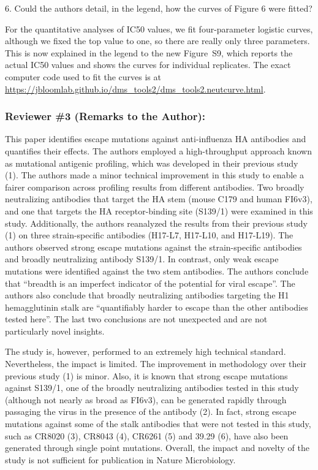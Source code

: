 \documentclass[11pt, oneside]{article}   	%
\begin{document}
6. Could the authors detail, in the legend, how the curves of Figure 6 were fitted?

{\color{black}
For the quantitative analyses of IC50 values, we fit four-parameter logistic curves, although we fixed the top value to one, so there are really only three parameters.
This is now explained in the legend to the new Figure~S9, which reports the actual IC50 values and shows the curves for individual replicates.
The exact computer code used to fit the curves is at \url{https://jbloomlab.github.io/dms_tools2/dms_tools2.neutcurve.html}.
}

\subsubsection*{Reviewer \#3 (Remarks to the Author):}

This paper identifies escape mutations against anti-influenza HA antibodies and quantifies their effects. The authors employed a high-throughput approach known as mutational antigenic profiling, which was developed in their previous study (1). The authors made a minor technical improvement in this study to enable a fairer comparison across profiling results from different antibodies. Two broadly neutralizing antibodies that target the HA stem (mouse C179 and human FI6v3), and one that targets the HA receptor-binding site (S139/1) were examined in this study. Additionally, the authors reanalyzed the results from their previous study (1) on three strain-specific antibodies (H17-L7, H17-L10, and H17-L19). The authors observed strong escape mutations against the strain-specific antibodies and broadly neutralizing antibody S139/1. In contrast, only weak escape mutations were identified against the two stem antibodies. The authors conclude that ``breadth is an imperfect indicator of the potential for viral escape''. The authors also conclude that broadly neutralizing antibodies targeting the H1 hemagglutinin stalk are ``quantifiably harder to escape than the other antibodies tested here''. The last two conclusions are not unexpected and are not particularly novel insights.

The study is, however, performed to an extremely high technical standard. Nevertheless, the impact is limited. The improvement in methodology over their previous study (1) is minor. Also, it is known that strong escape mutations against S139/1, one of the broadly neutralizing antibodies tested in this study (although not nearly as broad as FI6v3), can be generated rapidly through passaging the virus in the presence of the antibody (2). In fact, strong escape mutations against some of the stalk antibodies that were not tested in this study, such as CR8020 (3), CR8043 (4), CR6261 (5) and 39.29 (6), have also been generated through single point mutations. Overall, the impact and novelty of the study is not sufficient for publication in Nature Microbiology. 
\end{document}
